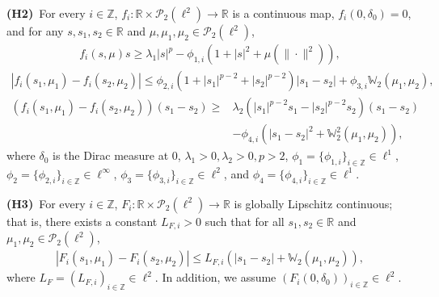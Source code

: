 \documentclass[11pt]{article}
\numberwithin{equation}{section}
\theoremstyle{plain}
\begin{document}
 \noindent
{\bf(H2)}\  For every
$i\in \mathbb{Z}$,
$f_i: \mathbb{R} \times  \mathcal{P}_2(\ell^2)
\to \mathbb{R}$ is  a continuous map,
 $f_i(0,\delta_0) = 0$,
  and for any $ s, s_1, s_2 \in \mathbb{R} $ and $\mu, \mu_1, \mu_2 \in  \mathcal{P}_2(\ell^2)$,
 \begin{align}\label{f1}
    f_i(s,\mu) s
    \ge \lambda_1 |s|^p - \phi_{1,i} \left( 1 + |s|^2 + \mu(\|\cdot\|^2) \right),
 \end{align}
 \begin{align}\label{f2}
    | f_i(s_1,\mu_1) - f_i(s_2, \mu_2) |
    \le \phi_{2,i} \left( 1 + |s_1|^{p-2} + |s_2|^{p-2} \right) |s_1 - s_2 |
         + \phi_{3,i} \mathbb{W}_2(\mu_1,\mu_2),
 \end{align}
 \begin{align}\label{f3}
    \left( f_i(s_1,\mu_1) - f_i(s_2,\mu_2) \right) (s_1 - s_2)
    \ge & \lambda_2 \left( |s_1|^{p-2} s_1 - |s_2|^{p-2} s_2 \right) ( s_1 - s_2 ) \nonumber\\
         & - \phi_{4,i} \left( |s_1 - s_2|^2 + \mathbb{W}_2^2(\mu_1,\mu_2) \right),
\end{align}
 where
      $\delta_0 $ is the Dirac measure at $ 0 $,
      $\lambda_1 > 0, \lambda_2 > 0, p > 2$,
      $\phi_1 = \{\phi_{1,i}\}_{i \in \mathbb{Z}} \in \ell^1$,
      $\phi_2 = \{ \phi_{2,i} \}_{ i \in \mathbb{Z} } \in \ell^{\infty}$,
      $\phi_3 = \{ \phi_{3,i} \}_{ i \in \mathbb{Z} } \in \ell^2$,
 and
      $\phi_4 = \{\phi_{4,i}\}_{i \in \mathbb{Z}} \in \ell^1$.

 
 
 

\noindent
 {\bf(H3)}\ 
  For every
$i\in \mathbb{Z}$,
$F_i: \mathbb{R} \times  \mathcal{P}_2(\ell^2)
\to \mathbb{R}$ is  globally Lipschitz continuous;
that is,
    there exists a constant $L_{F,i} > 0$
 such that for all $ s_1, s_2 \in \mathbb{R} $ and $\mu_1, \mu_2 \in \mathcal{P}_2(\ell^2)$,
 \begin{align}\label{F1}
    | F_i(s_1, \mu_1) - F_i(s_2,\mu_2) |
    \le L_{F,i} \left( |s_1 - s_2| + \mathbb{W}_2(\mu_1,\mu_2) \right),
 \end{align}
 where $L_F = (L_{F,i})_{i \in \mathbb{Z}} \in \ell^2$.
 In addition, we assume  
 $(F_i(0, \delta_0))_{i \in \mathbb{Z}} \in \ell^2$.
\end{document}
